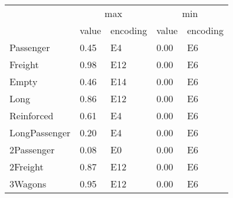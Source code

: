 \begin{tabular}{lllll}
\toprule
 & \multicolumn{2}{c}{max} & \multicolumn{2}{c}{min} \\
 & value & encoding & value & encoding \\
\midrule
Passenger & 0.45 & E4 & 0.00 & E6 \\
Freight & 0.98 & E12 & 0.00 & E6 \\
Empty & 0.46 & E14 & 0.00 & E6 \\
Long & 0.86 & E12 & 0.00 & E6 \\
Reinforced & 0.61 & E4 & 0.00 & E6 \\
LongPassenger & 0.20 & E4 & 0.00 & E6 \\
2Passenger & 0.08 & E0 & 0.00 & E6 \\
2Freight & 0.87 & E12 & 0.00 & E6 \\
3Wagons & 0.95 & E12 & 0.00 & E6 \\
\bottomrule
\end{tabular}
